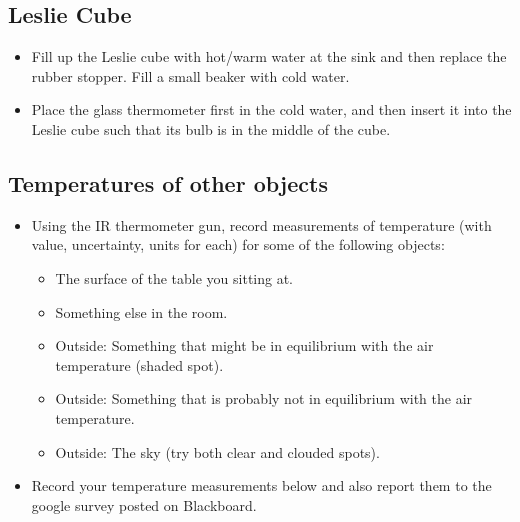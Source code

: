 \subsection{Leslie Cube}

\begin{itemize}
\item Fill up the Leslie cube with hot/warm water at the sink and then replace the rubber stopper. Fill a small beaker with cold water.
\item Place the glass thermometer first in the cold water, and then insert it into the Leslie cube such that its bulb is in the middle of the cube.
\end{itemize}
%
\begin{questions}
\end{questions}


\subsection{Temperatures of other objects}

\begin{itemize}
\item Using the IR thermometer gun, record measurements of temperature (with value, uncertainty, units for each) for some of the following objects:
	\begin{itemize}
	\item The surface of the table you sitting at.
	\item Something else in the room.
	\item Outside: Something that might be in equilibrium with the air temperature (shaded spot).
	\item Outside: Something that is probably not in equilibrium with the air temperature.
	\item Outside: The sky (try both clear and clouded spots).
	\end{itemize}
\item Record your temperature measurements below and also report them to the google survey posted on Blackboard.
\end{itemize}

